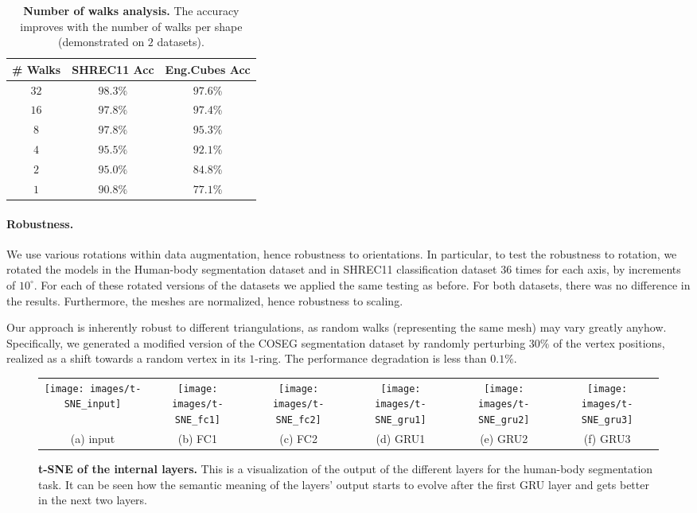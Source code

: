 \documentclass[acmtog]{acmart}
\begin{document}
\begin{table}[tb]\caption{{\bf Number of walks analysis.}
The accuracy improves with the number of walks per shape (demonstrated on $2$ datasets). 
}
\begin{center}
 \begin{tabular}{||c c c||} 
 \hline
 \# Walks & SHREC11 Acc & Eng.Cubes Acc\\ [0.5ex] 
 \hline\hline\hline
 $32$ & $98.3\%$ & $97.6$\%  \\ 
 \hline
 $16$ & $97.8\%$ & $97.4$\%   \\ 
 \hline
 $8$ & $97.8\%$ & $95.3$\%   \\ 
 \hline
 $4$ & $95.5\%$ & $92.1$\%   \\ 
 \hline
 $2$ & $95.0\%$ & $84.8$\%   \\ 
 \hline
 $1$ & $90.8\%$ & $77.1$\%   \\ 
 \hline
  \end{tabular}
\label{tbl:accuracy_per_n_walks}
\end{center}
\end{table}

\paragraph{Robustness.}
We use various rotations within data augmentation, hence robustness to orientations.
In particular, to test the robustness to rotation, we rotated the models in the Human-body segmentation dataset and in SHREC11 classification dataset $36$ times for each axis, by increments of $10^\circ$.
For each of these rotated versions of the datasets we applied the same testing as before.
For both datasets, there was no difference in the results.
Furthermore, the meshes are normalized, hence robustness to scaling. 

Our approach is inherently robust to different triangulations, as random walks (representing the same mesh) may vary greatly anyhow. 
Specifically, we generated a modified version of the COSEG segmentation dataset by randomly perturbing $30\%$ of the vertex positions, realized as a shift towards a random vertex in its $1$-ring. 
The performance degradation is less than $0.1\%$.

\begin{figure*}
\centering
\begin{tabular}{cccccc}
\texttt{[image: images/t-SNE\_input]}&
\texttt{[image: images/t-SNE\_fc1]}&
\texttt{[image: images/t-SNE\_fc2]}&
\texttt{[image: images/t-SNE\_gru1]}&
\texttt{[image: images/t-SNE\_gru2]}&
\texttt{[image: images/t-SNE\_gru3]}\\
(a) input &
(b) FC1 &
(c) FC2 &
(d) GRU1&
(e) GRU2 &
(f) GRU3
\end{tabular}
\caption{{\bf t-SNE of the internal layers.}
This is a visualization of the output of the different layers for the human-body segmentation task.
It can be seen how the semantic meaning of the layers' output starts to evolve after the first GRU layer and gets better in the next two layers.
} 
\label{fig:t_sne_all_layers}
\end{figure*}
\end{document}
